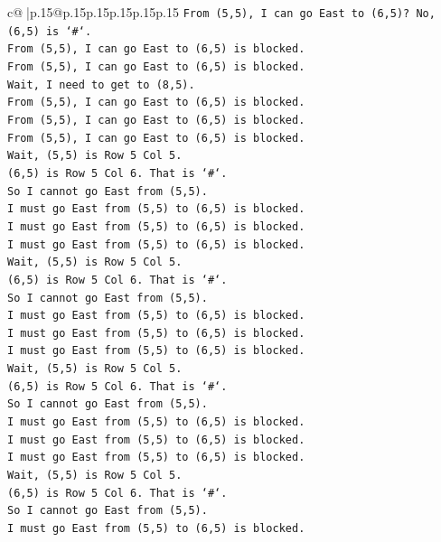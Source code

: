 \documentclass{article}
\begin{document}
{\begin{supertabular}{c@{$\;$}|p{.15\linewidth}@{}p{.15\linewidth}p{.15\linewidth}p{.15\linewidth}p{.15\linewidth}p{.15\linewidth}}
{{{\texttt{From (5,5), I can go East to (6,5)? No, (6,5) is `\#`.} \\
\texttt{From (5,5), I can go East to (6,5) is blocked.} \\
\texttt{From (5,5), I can go East to (6,5) is blocked.} \\
\texttt{Wait, I need to get to (8,5).} \\
\texttt{From (5,5), I can go East to (6,5) is blocked.} \\
\texttt{From (5,5), I can go East to (6,5) is blocked.} \\
\texttt{From (5,5), I can go East to (6,5) is blocked.} \\
\texttt{Wait, (5,5) is Row 5 Col 5.} \\
\texttt{(6,5) is Row 5 Col 6. That is `\#`.} \\
\texttt{So I cannot go East from (5,5).} \\
\texttt{I must go East from (5,5) to (6,5) is blocked.} \\
\texttt{I must go East from (5,5) to (6,5) is blocked.} \\
\texttt{I must go East from (5,5) to (6,5) is blocked.} \\
\texttt{Wait, (5,5) is Row 5 Col 5.} \\
\texttt{(6,5) is Row 5 Col 6. That is `\#`.} \\
\texttt{So I cannot go East from (5,5).} \\
\texttt{I must go East from (5,5) to (6,5) is blocked.} \\
\texttt{I must go East from (5,5) to (6,5) is blocked.} \\
\texttt{I must go East from (5,5) to (6,5) is blocked.} \\
\texttt{Wait, (5,5) is Row 5 Col 5.} \\
\texttt{(6,5) is Row 5 Col 6. That is `\#`.} \\
\texttt{So I cannot go East from (5,5).} \\
\texttt{I must go East from (5,5) to (6,5) is blocked.} \\
\texttt{I must go East from (5,5) to (6,5) is blocked.} \\
\texttt{I must go East from (5,5) to (6,5) is blocked.} \\
\texttt{Wait, (5,5) is Row 5 Col 5.} \\
\texttt{(6,5) is Row 5 Col 6. That is `\#`.} \\
\texttt{So I cannot go East from (5,5).} \\
\texttt{I must go East from (5,5) to (6,5) is blocked.} \\
}}}
\end{supertabular}}
\end{document}
